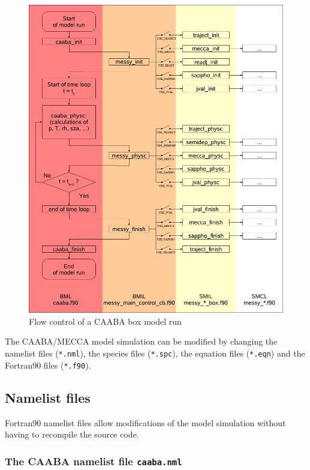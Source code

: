 \documentclass[twoside]{article}
\begin{document}
\begin{figure}%
  \begin{center}
  \includegraphics[width=\textwidth]{caaba_flowcontrol}
  \end{center}
  \caption{Flow control of a CAABA box model run}
  \label{fig:caaba_flowcontrol}
\end{figure}

The CAABA/MECCA model simulation can be modified by changing the
namelist files (\verb|*.nml|), the species files (\verb|*.spc|), the
equation files (\verb|*.eqn|) and the Fortran90 files (\verb|*.f90|).

\subsection{Namelist files}
\label{sec:nmlfiles}

Fortran90 namelist files allow modifications of the model simulation
without having to recompile the source code.

\subsubsection{The CAABA namelist file {\tt caaba.nml}}
\label{sec:caaba_nml}
\end{document}
